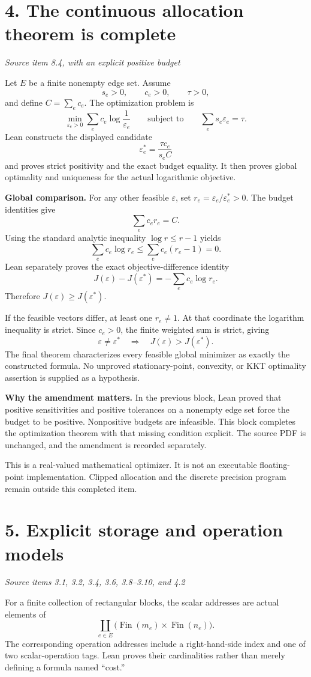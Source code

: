 \documentclass[11pt]{article}
\newcommand{\pageheading}[2]{\section*{\color{ink}#1}\textit{#2}\par}
\begin{document}
\newpage
\pageheading{4. The continuous allocation theorem is complete}{Source item 8.4, with an explicit positive budget}
Let $E$ be a finite nonempty edge set. Assume
\[
s_e>0,\qquad c_e>0,\qquad \tau>0,
\]
and define $C=\sum_ec_e$. The optimization problem is
\[
\min_{\varepsilon_e>0}\sum_ec_e\log\frac1{\varepsilon_e}
\qquad\text{subject to}\qquad
\sum_es_e\varepsilon_e=\tau.
\]
Lean constructs the displayed candidate
\[
\boxed{\varepsilon_e^*=\frac{\tau c_e}{s_eC}}
\]
and proves strict positivity and the exact budget equality. It then proves global optimality and uniqueness for the actual logarithmic objective.

\textbf{Global comparison.} For any other feasible $\varepsilon$, set
$r_e=\varepsilon_e/\varepsilon_e^*>0$. The budget identities give
\[
\sum_ec_er_e=C.
\]
Using the standard analytic inequality $\log r\leq r-1$ yields
\[
\sum_ec_e\log r_e\leq\sum_ec_e(r_e-1)=0.
\]
Lean separately proves the exact objective-difference identity
\[
J(\varepsilon)-J(\varepsilon^*)=-\sum_ec_e\log r_e.
\]
Therefore $J(\varepsilon)\geq J(\varepsilon^*)$.

If the feasible vectors differ, at least one $r_e\ne1$. At that coordinate the logarithm inequality is strict. Since $c_e>0$, the finite weighted sum is strict, giving
\[
\varepsilon\ne\varepsilon^*\quad\Longrightarrow\quad
J(\varepsilon)>J(\varepsilon^*).
\]
The final theorem characterizes every feasible global minimizer as exactly the constructed formula. No unproved stationary-point, convexity, or KKT optimality assertion is supplied as a hypothesis.

\textbf{Why the amendment matters.} In the previous block, Lean proved that positive sensitivities and positive tolerances on a nonempty edge set force the budget to be positive. Nonpositive budgets are infeasible. This block completes the optimization theorem with that missing condition explicit. The source PDF is unchanged, and the amendment is recorded separately.

This is a real-valued mathematical optimizer. It is not an executable floating-point implementation. Clipped allocation and the discrete precision program remain outside this completed item.

\newpage
\pageheading{5. Explicit storage and operation models}{Source items 3.1, 3.2, 3.4, 3.6, 3.8--3.10, and 4.2}
For a finite collection of rectangular blocks, the scalar addresses are actual elements of
\[
\coprod_{e\in E}\bigl(\operatorname{Fin}(m_e)\times\operatorname{Fin}(n_e)\bigr).
\]
The corresponding operation addresses include a right-hand-side index and one of two scalar-operation tags. Lean proves their cardinalities rather than merely defining a formula named ``cost.''
\end{document}
